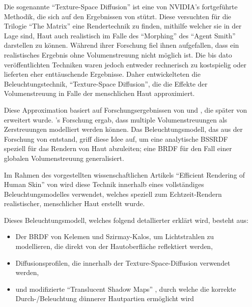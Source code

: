 \documentclass[ngerman,runningheads,a4paper]{llncs}[2018/03/10]
\begin{document}
Die sogenannte \enquote{Texture-Space Diffusion} ist eine von NVIDIA's \citet{efficient-human-skin-rendering} fortgeführte Methodik, die sich auf den Ergebnissen von \citet{realistic-human-face-rendering-matrix} stützt.
Diese versuchten für die Trilogie \enquote{The Matrix} eine Rendertechnik zu finden, mithilfe welcher sie in der Lage sind, Haut auch realistisch im Falle des \enquote{Morphing} des \enquote{Agent Smith} darstellen zu können.
Während ihrer Forschung fiel ihnen aufgefallen, dass ein realistisches Ergebnis ohne Volumenstreuung nicht möglich ist.
Die bis dato veröffentlichten Techniken waren jedoch entweder rechnerisch zu kostspielig oder lieferten eher enttäuschende Ergebnisse.
Daher entwickelteten \citet{realistic-human-face-rendering-matrix} die Beleuchtungstechnik, \enquote{Texture-Space Diffusion}, die die Effekte der Volumenstreuung in Falle der menschlichen Haut approximiert.

Diese Approximation basiert auf Forschungsergebnissen von \citet{stam1995multiple} und \citet{spectral-bssrdf-human-skin}, die später von \citet{ma2007rapid} erweitert wurde.
\citeauthor{stam1995multiple}'s Forschung ergab, dass multiple Volumenstreuungen als Zerstreuungen modelliert werden können.
Das Beleuchtungsmodell, das aus der Forschung von \citeauthor{spectral-bssrdf-human-skin} entstand, griff diese Idee auf, um eine analytische BSSRDF speziell für das Rendern von Haut abzuleiten; eine BRDF für den Fall einer globalen Volumenstreuung generalisiert.

Im Rahmen des vorgestellten wissenschaftlichen Artikels \enquote{Efficient Rendering of Human Skin} von \citet{advanced-realtime-skin-rendering} wird diese Technik innerhalb eines vollständiges Beleuchtungsmodelles verwendet, welches speziell zum Echtzeit-Rendern realistischer, menschlicher Haut erstellt wurde.

Dieses Beleuchtungsmodell, welches folgend detallierter erklärt wird, besteht aus:

\begin{itemize}
  \item Der BRDF von Kelemen und Szirmay-Kalos, um Lichtstrahlen zu modellieren, die direkt von der Hautoberfläche reflektiert werden,
  \item Diffusionsprofilen, die innerhalb der Texture-Space-Diffusion verwendet werden,
  \item und modifizierte \enquote{Translucent Shadow Maps} \citep{translucent-shadow-maps}, durch welche die korrekte Durch-/Beleuchtung dünnerer Hautpartien ermöglicht wird
\end{itemize}
\end{document}
